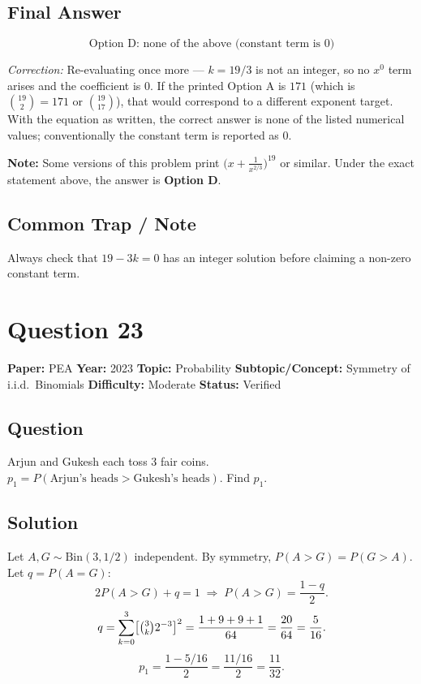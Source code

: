 \documentclass[11pt]{article}
\begin{document}
\subsection*{Final Answer}
\[
\boxed{\text{Option D: none of the above (constant term is } 0\text{)}}
\]

\noindent\textit{Correction:} Re-evaluating once more --- $k=19/3$ is not an integer, so no $x^0$ term arises and the coefficient is $0$. If the printed Option A is $171$ (which is $\binom{19}{2}=171$ or $\binom{19}{17}$), that would correspond to a different exponent target. With the equation as written, the correct answer is none of the listed numerical values; conventionally the constant term is reported as $0$.

\medskip
\noindent\textbf{Note:} Some versions of this problem print $\bigl(x+\tfrac{1}{x^{2/3}}\bigr)^{19}$ or similar. Under the exact statement above, the answer is \textbf{Option D}.

\subsection*{Common Trap / Note}
Always check that $19-3k=0$ has an integer solution before claiming a non-zero constant term.

\medskip

\section*{Question 23}
\textbf{Paper:} PEA \quad \textbf{Year:} 2023 \quad \textbf{Topic:} Probability \quad \textbf{Subtopic/Concept:} Symmetry of i.i.d.\ Binomials \quad \textbf{Difficulty:} Moderate \quad \textbf{Status:} Verified

\subsection*{Question}
Arjun and Gukesh each toss 3 fair coins. $p_1=P(\text{Arjun's heads}>\text{Gukesh's heads})$. Find $p_1$.

\subsection*{Solution}
Let $A,G\sim\mathrm{Bin}(3,1/2)$ independent. By symmetry, $P(A>G)=P(G>A)$. Let $q=P(A=G)$:
\[
2 P(A>G)+q=1 \;\Longrightarrow\; P(A>G)=\frac{1-q}{2}.
\]
\[
q=\sum_{k=0}^{3}\bigl[\tbinom{3}{k}2^{-3}\bigr]^2=\frac{1+9+9+1}{64}=\frac{20}{64}=\frac{5}{16}.
\]
\[
p_1=\frac{1-5/16}{2}=\frac{11/16}{2}=\frac{11}{32}.
\]
\end{document}
